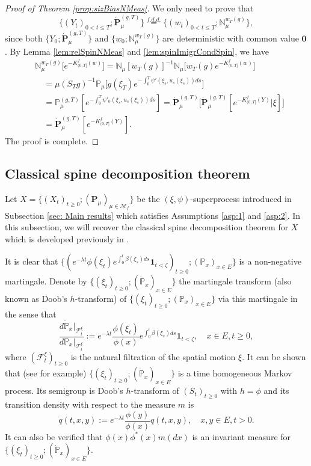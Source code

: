 \documentclass[UTF8]{pkuthss}
\theoremstyle{plain}
\theoremstyle{definition}
\numberwithin{equation}{section}
\begin{document}
\begin{proof}[Proof of Theorem \ref{prop:sizBiasNMeas}]
    We only need to prove that
\[
	\{(Y_t)_{0<t\le T}; \dot{\mathbf P}^{(g,T)}_\mu\}
	\overset{f.d.d.}{=} \{(w_t)_{0<t\le T}; \mathbb N_\mu^{w_T(g)}\},
\]
	since both $\{Y_0; \dot{\mathbf P}^{(g,T)}_\mu\}$ and $\{w_0; \mathbb N_\mu^{w_T(g)}\}$ are deterministic with common value $\mathbf 0$.
	By Lemma \ref{lem:relSpinNMeas} and \ref{lem:spinImigrCondSpin}, we have
	\[\begin{split}
    &\mathbb N_\mu^{w_T(g)}\big[e^{-K_{(0, T]}^f(w)}\big]
	=\mathbb N_\mu[w_T(g)]^{-1} \mathbb N_\mu \big[w_T(g) e^{-K_{(0, T]}^f(w)}\big]\\
	&\quad =\mu(S_Tg)^{-1}  \mathbb P_\mu\big[g(\xi_T) e^{-\int_0^T \psi'(\xi_s,u_s(\xi_s)) ds}\big]\\
	&\quad =\mathbb P^{(g,T)}_{\mu}[e^{-\int_0^T \psi'_0(\xi_s, u_s(\xi_s)) ds}]
	=\dot {\mathbf P}^{(g,T)}_\mu\big[ \dot{\mathbf P}^{(g,T)}_\mu[e^{-K_{(0, T]}^f(Y)}|\xi] \big]\\
	&\quad = \dot{\mathbf P}^{(g,T)}_\mu[e^{-K_{(0, T]}^f(Y)}].
\end{split}\]
	The proof is complete.
\end{proof}

\subsection{Classical spine decomposition theorem}
\label{sec: classcal spine decomposition}
	Let $X=\{(X_t)_{t\geq 0}; (\mathbf P_\mu)_{\mu \in \mathcal M_f}\}$ be the $(\xi,\psi)$-superprocess introduced in Subsection \ref{sec: Main results} which satisfies Assumptions \ref{asp:1} and \ref{asp:2}.
	In this subsection, we will recover the classical spine decomposition theorem for $X$ which is developed previously in \cite{EckhoffKyprianouWinkel2015Spines, EnglanderKyprianou2004Local, LiuRenSong2009LlogL}.

	It is clear that $\{(e^{-\lambda t}\phi(\xi_t) e^{\int_0^t \beta(\xi_s) ds}\mathbf 1_{t< \zeta})_{t \geq 0}; (\mathbb P_x)_{x\in E}\}$ is a non-negative martingale.
	Denote by $\{(\xi_t)_{t\geq 0}; (\dot{\mathbb P}_x)_{x\in E}\}$ the martingale transform (also known as Doob's $h$-transform) of $\{(\xi_t)_{t\geq 0}; (\mathbb P_x)_{x\in E}\}$ via this martingale in the sense that
\[
	\frac {d \dot{\mathbb P}_x|_{\mathscr F_t^\xi}} {d \mathbb P_x|_{\mathscr F_t^\xi}}
	:=e^{-\lambda t} \frac {\phi(\xi_t)} {\phi(x)} e^{\int_0^t \beta(\xi_s) ds} \mathbf 1_{t< \zeta},
	\quad x \in E,t \geq 0,
\]
	where $(\mathscr F^\xi_t)_{t\geq 0}$ is the natural filtration of the spatial motion $\xi$.
   It can be shown that
	(see \cite{KimSong2008Intrinsic} for example) $\{(\xi_t)_{t\geq 0}; (\dot{\mathbb P}_x)_{x\in E}\}$ is a time homogeneous Markov 
	process.
 Its semigroup is Doob's  $h$-transform of $(S_t)_{t\geq 0}$ with $h=\phi$ and its transition density with respect to the measure $m$ is
\[
	\dot{q}(t,x,y)
	:= e^{-\lambda t}\frac {\phi(y)} {\phi(x)} q(t,x,y),
	\quad x, y\in E, t> 0.
\]
	It can also be verified that $\phi(x)\phi^*(x)m(dx)$ is an invariant measure for $\{(\xi_t)_{t\geq 0}; (\dot{\mathbb P}_x)_{x\in E}\}$.
\end{document}
